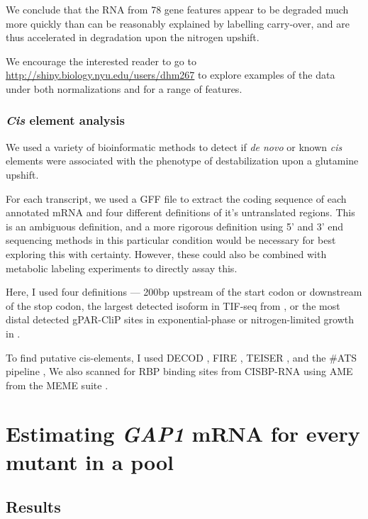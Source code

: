 We conclude that the RNA from 78 gene
features appear to be degraded much more quickly than can be reasonably
explained by labelling carry-over, and are thus accelerated in
degradation upon the nitrogen upshift.

We encourage the interested reader to go to
\url{http://shiny.biology.nyu.edu/users/dhm267} to explore examples of
the data under both normalizations and for a range of features.

\subsubsection{\textit{Cis} element analysis}

We used a variety of bioinformatic methods to detect if \emph{de novo}
or known \emph{cis} elements were associated with the phenotype of
destabilization upon a glutamine upshift.

For each transcript, we used a GFF file to extract the coding sequence
of each annotated mRNA and four different definitions of it's
untranslated regions. This is an ambiguous definition, and a more
rigorous definition using 5' and 3' end sequencing methods in this
particular condition would be necessary for best exploring this with
certainty. However, these could also be combined with metabolic
labeling experiments \parencite{gupta2014alternative} to directly
assay this. 

Here, I used four definitions --- 
200bp upstream of the start codon or downstream
of the stop codon, the largest detected isoform in TIF-seq from
\parencite{pelechano2014genome}, 
or the most distal detected gPAR-CliP sites in
exponential-phase or nitrogen-limited growth in 
\parencite{freeberg2013pervasive}.

To find putative cis-elements, 
I used DECOD \parencite{huggins2011decod}, 
FIRE \parencite{elemento2007universal},
TEISER \parencite{goodarzi2012systematic},
and the \#ATS pipeline \parencite{li2010predicting},
We also scanned for RBP binding sites from
CISBP-RNA \parencite{ray2013compendium}
using AME from the MEME suite \parencite{mcleay2010motif}.


\section{Estimating \textit{GAP1} mRNA for every mutant in a pool}

\subsection{Results}

